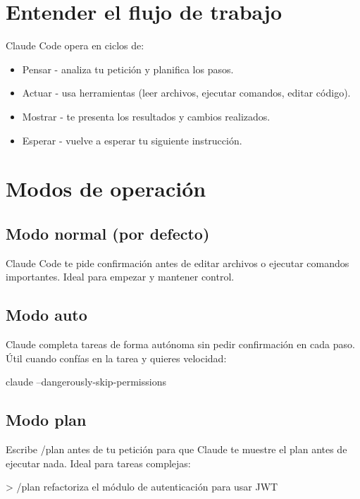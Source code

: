 \documentclass[11pt,a4paper]{book}
\begin{document}
\section{Entender el flujo de trabajo}
Claude Code opera en ciclos de:

\begin{itemize}\item Pensar - analiza tu petición y planifica los pasos.\end{itemize}
\begin{itemize}\item Actuar - usa herramientas (leer archivos, ejecutar comandos, editar código).\end{itemize}
\begin{itemize}\item Mostrar - te presenta los resultados y cambios realizados.\end{itemize}
\begin{itemize}\item Esperar - vuelve a esperar tu siguiente instrucción.\end{itemize}
\section{Modos de operación}
\subsection{Modo normal (por defecto)}
Claude Code te pide confirmación antes de editar archivos o ejecutar comandos importantes. Ideal para empezar y mantener control.

\subsection{Modo auto}
Claude completa tareas de forma autónoma sin pedir confirmación en cada paso. Útil cuando confías en la tarea y quieres velocidad:

\begin{codebox}
claude --dangerously-skip-permissions
\end{codebox}
\subsection{Modo plan}
Escribe /plan antes de tu petición para que Claude te muestre el plan antes de ejecutar nada. Ideal para tareas complejas:

\begin{codebox}
> /plan refactoriza el módulo de autenticación para usar JWT
\end{codebox}
\end{document}
